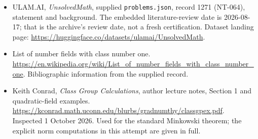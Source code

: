 \documentclass[11pt,a4paper]{article}
\begin{document}
{\small

\begin{itemize}

\item[\hypertarget{source:1271:1}{S1}] ULAM.AI, \emph{UnsolvedMath}, supplied \texttt{problems.json}, record 1271 (NT-064), statement and background. The embedded literature-review date is 2026-08-17; that is the archive’s review date, not a fresh certification. Dataset landing page: \url{https://huggingface.co/datasets/ulamai/UnsolvedMath}.

\item[\hypertarget{source:1271:2}{S2}] List of number fields with class number one. \url{https://en.wikipedia.org/wiki/List_of_number_fields_with_class_number_one}. Bibliographic information from the supplied record.


\item[E1] Keith Conrad, \emph{Class Group Calculations},
author lecture notes, Section 1 and quadratic-field examples.
\url{https://kconrad.math.uconn.edu/blurbs/gradnumthy/classgpex.pdf}.
Inspected 1 October 2026. Used for the standard Minkowski theorem;
the explicit norm computations in this attempt are given in full.

\end{itemize}

}

\label{end:1271}
\end{document}
